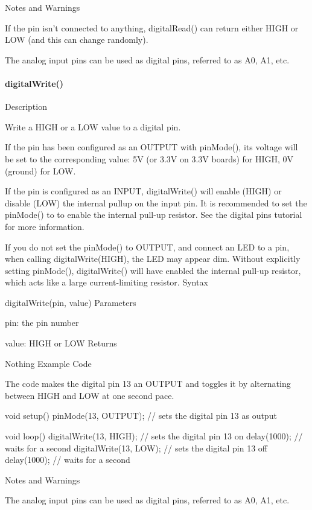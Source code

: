 \documentclass[12pt,a4paper]{book}  %
\begin{document}
Notes and Warnings

If the pin isn’t connected to anything, digitalRead() can return either HIGH or LOW (and this can change randomly).

The analog input pins can be used as digital pins, referred to as A0, A1, etc.

\paragraph{digitalWrite()}


Description

Write a HIGH or a LOW value to a digital pin.

If the pin has been configured as an OUTPUT with pinMode(), its voltage will be set to the corresponding value: 5V (or 3.3V on 3.3V boards) for HIGH, 0V (ground) for LOW.

If the pin is configured as an INPUT, digitalWrite() will enable (HIGH) or disable (LOW) the internal pullup on the input pin. It is recommended to set the pinMode() to
to enable the internal pull-up resistor. See the digital pins tutorial for more information.

If you do not set the pinMode() to OUTPUT, and connect an LED to a pin, when calling digitalWrite(HIGH), the LED may appear dim. Without explicitly setting pinMode(), digitalWrite() will have enabled the internal pull-up resistor, which acts like a large current-limiting resistor.
Syntax

digitalWrite(pin, value)
Parameters

pin: the pin number

value: HIGH or LOW
Returns

Nothing
Example Code

The code makes the digital pin 13 an OUTPUT and toggles it by alternating between HIGH and LOW at one second pace.

void setup()
{
  pinMode(13, OUTPUT);          // sets the digital pin 13 as output
}

void loop()
{
  digitalWrite(13, HIGH);       // sets the digital pin 13 on
  delay(1000);                  // waits for a second
  digitalWrite(13, LOW);        // sets the digital pin 13 off
  delay(1000);                  // waits for a second
}

Notes and Warnings

The analog input pins can be used as digital pins, referred to as A0, A1, etc.
\end{document}
